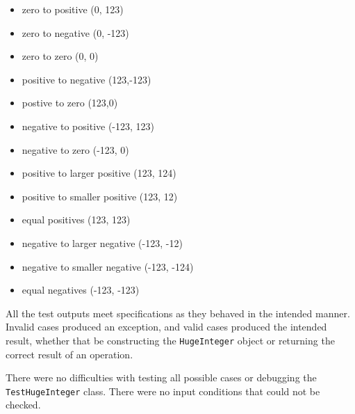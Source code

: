 \documentclass[12pt]{article}
\newcommand{\code}[1]{\texttt{#1}}
\begin{document}
\begin{itemize}
    \item zero to positive (0, 123)
    \item zero to negative (0, -123)
    \item zero to zero (0, 0)
    \item positive to negative (123,-123)
    \item postive to zero (123,0)
    \item negative to positive (-123, 123)
    \item negative to zero (-123, 0)
    \item positive to larger positive (123, 124)
    \item positive to smaller positive (123, 12)
    \item equal positives (123, 123)
    \item negative to larger negative (-123, -12)
    \item negative to smaller negative (-123, -124)
    \item equal negatives (-123, -123)
\end{itemize}

All the test outputs meet specifications as they behaved in the intended manner. Invalid cases produced an exception, and valid cases produced the intended result, whether that be constructing the \code{HugeInteger} object or returning the correct result of an operation.

There were no difficulties with testing all possible cases or debugging the \code{TestHugeInteger} class. There were no input conditions that could not be checked.
\end{document}
